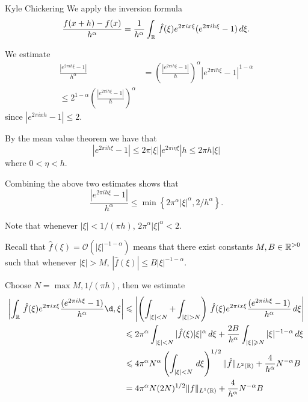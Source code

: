 

\begin{solution}{Kyle Chickering}
        We apply the inversion formula
        \[ \frac{f(x+h)-f(x)}{h^\alpha} = \frac{1}{h^\alpha}\int_{\mathbb{R}}\,\hat{f}(\xi)e^{2\pi i x\xi}(e^{2\pi ih\xi} - 1)\,d\xi. \]

        We estimate
        \begin{align*}
                \frac{|e^{2\pi i h \xi}-1|}{h^\alpha} &= \left(\frac{|e^{2\pi i h\xi}-1|}{h}\right)^{\alpha}|e^{2\pi i h \xi}-1|^{1-\alpha} \\
                \leqslant 2^{1-\alpha}\left(\frac{|e^{2\pi i h \xi}-1|}{h}\right)^{\alpha}
        \end{align*}
        since $|e^{2\pi i x h}-1|\leqslant 2$.

        By the mean value theorem we have that
        \[ |e^{2\pi i h \xi}-1|\leqslant 2\pi |\xi||e^{2\pi i \eta \xi}|h \leqslant 2\pi h |\xi| \]
        where $0<\eta < h$.

        Combining the above two estimates shows that
        \[ \frac{|e^{2\pi i h \xi}-1|}{h^\alpha} \leqslant \min\left\{2\pi^\alpha|\xi|^\alpha, 2/h^\alpha\right\}. \]

        Note that whenever $|\xi|<1/(\pi h)$, $2\pi^\alpha|\xi|^\alpha < 2$.

        Recall that $\hat{f}(\xi)=\mathcal{O}(|\xi|^{-1-\alpha})$ means that there exist constants $M,B\in \mathbb{R}^{>0}$ such that whenever $|\xi|>M$, $|\hat{f}(\xi)|\leqslant B|\xi|^{-1-\alpha}$.

        Choose $N=\max{M,1/(\pi h)}$, then we estimate
        \begin{align*}
                \left|\int_{\reals}\,\hat{f}(\xi)e^{2\pi i x\xi}\frac{(e^{2\pi ih\xi}-1)}{h^\alpha}\d,\xi\right| &\leqslant \left|\left(\int_{|\xi|<N}+\int_{|\xi|>N}\right)\, \hat{f}(\xi)e^{2\pi i x\xi}\frac{(e^{2\pi i h\xi}-1)}{h^\alpha}\,d\xi\right| \\
                                                                                                             &\leqslant 2\pi^\alpha \int_{|\xi|<N}|\hat{f}(\xi)|\xi|^\alpha\,d\xi +\frac{2B}{h^\alpha}\int_{|\xi|\geqslant N}|\xi|^{-1-\alpha}\,d\xi \\
                                                                                                             &\leqslant 4\pi^\alpha N^\alpha \left(\int_{|\xi|<N}\,d\xi\right)^{1/2}\norm{\hat{f}}_{L^2(\reals)} + \frac{4}{h^\alpha}N^{-\alpha}B \\
                                                                                                             &= 4\pi^\alpha N(2N)^{1/2}\norm{f}_{L^1(\reals)} + \frac{4}{h^\alpha}N^{-\alpha}B
        \end{align*}


\end{solution}
